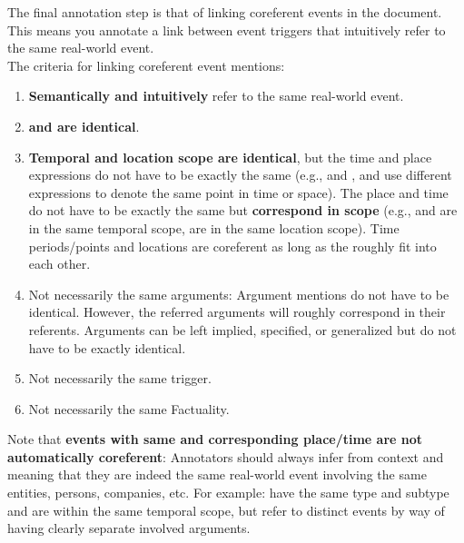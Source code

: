 The final annotation step is that of linking coreferent events in the document.
This means you annotate a link between event triggers that intuitively refer to the same real-world event.\\[10pt]
\noindent
The criteria for linking coreferent event mentions:
\begin{enumerate}[noitemsep]
    \item \textbf{Semantically and intuitively} refer to the same real-world event.
    \item \textbf{ and  are identical}.
    \item \textbf{Temporal and location scope are identical}, but the time and place expressions do not have to be exactly the same (e.g.,  and ,  and  use different expressions to denote the same point in time or space).
    The place and time do not have to be exactly the same but \textbf{correspond in scope} (e.g.,  and  are in the same temporal scope,  are in the same location scope).
    Time periods/points and locations are coreferent as long as the roughly fit into each other.
    \item Not necessarily the same arguments:
    Argument mentions do not have to be identical.
    However, the referred arguments will roughly correspond in their referents.
    Arguments can be left implied, specified, or generalized but do not have to be exactly identical.
    \item Not necessarily the same trigger.
    \item Not necessarily the same Factuality.
\end{enumerate}

\noindent
Note that \textbf{events with same  and corresponding place/time are not automatically coreferent}:
Annotators should always infer from context and meaning that they are indeed the same real-world event involving the same entities, persons, companies, etc.
For example:  have the same  type and subtype and are within the same temporal scope, but refer to distinct events by way of having clearly separate involved arguments.\\

